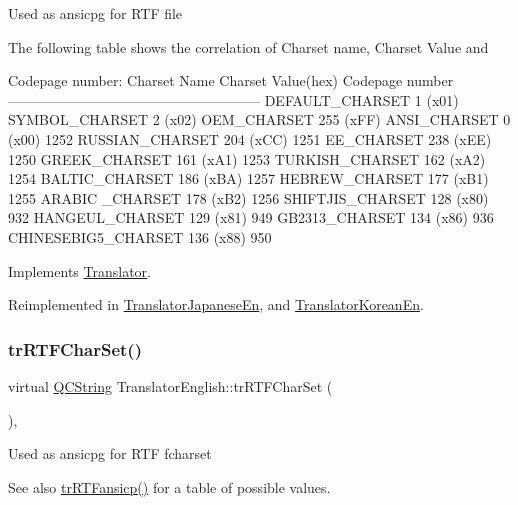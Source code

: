Used as ansicpg for R\+TF file

The following table shows the correlation of Charset name, Charset Value and 
\begin{DoxyPre}
Codepage number:
Charset Name       Charset Value(hex)  Codepage number
------------------------------------------------------
DEFAULT\_CHARSET           1 (x01)
SYMBOL\_CHARSET            2 (x02)
OEM\_CHARSET             255 (xFF)
ANSI\_CHARSET              0 (x00)            1252
RUSSIAN\_CHARSET         204 (xCC)            1251
EE\_CHARSET              238 (xEE)            1250
GREEK\_CHARSET           161 (xA1)            1253
TURKISH\_CHARSET         162 (xA2)            1254
BALTIC\_CHARSET          186 (xBA)            1257
HEBREW\_CHARSET          177 (xB1)            1255
ARABIC \_CHARSET         178 (xB2)            1256
SHIFTJIS\_CHARSET        128 (x80)             932
HANGEUL\_CHARSET         129 (x81)             949
GB2313\_CHARSET          134 (x86)             936
CHINESEBIG5\_CHARSET     136 (x88)             950
\end{DoxyPre}
 

Implements \mbox{\hyperlink{class_translator_a9953a4c0e6a4fc7d017abcd5c2939e0f}{Translator}}.



Reimplemented in \mbox{\hyperlink{class_translator_japanese_en_a4da6df8b58582eb97ffef9f75e070c0f}{Translator\+Japanese\+En}}, and \mbox{\hyperlink{class_translator_korean_en_ac60d57743cc1cd0a7b6bc6c57a445b7e}{Translator\+Korean\+En}}.

\mbox{\label{class_translator_english_a5c66e7339c73f03d5cae6291c21b98b8}} 
\subsubsection{\texorpdfstring{trRTFCharSet()}{trRTFCharSet()}}
{\footnotesize\ttfamily virtual \mbox{\hyperlink{class_q_c_string}{Q\+C\+String}} Translator\+English\+::tr\+R\+T\+F\+Char\+Set (\begin{DoxyParamCaption}{ }\end{DoxyParamCaption})\hspace{0.3cm}{\ttfamily [inline]}, {\ttfamily [virtual]}}

Used as ansicpg for R\+TF fcharset \begin{DoxySeeAlso}{See also}
\mbox{\hyperlink{class_translator_english_a58d43df9c7e82cf874f2d0ac64547a3a}{tr\+R\+T\+Fansicp()}} for a table of possible values. 
\end{DoxySeeAlso}


